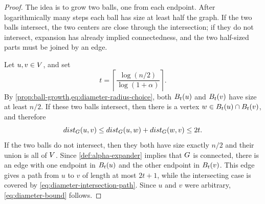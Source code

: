 \begin{proof}
	The idea is to grow two balls, one from each endpoint. After logarithmically many steps each ball has size at least half the graph. If the two balls intersect, the two centers are close through the intersection; if they do not intersect, expansion has already implied connectedness, and the two half-sized parts must be joined by an edge.

	Let \(u,v\in V\), and set
	\begin{equation}
		\label{eq:diameter-radius-choice}
		t=\left\lceil\frac{\log(n/2)}{\log(1+\alpha)}\right\rceil.
	\end{equation}
	By \cref{prop:ball-growth,eq:diameter-radius-choice}, both \(B_t(u)\) and \(B_t(v)\) have size at least \(n/2\). If these two balls intersect, then there is a vertex \(w\in B_t(u)\cap B_t(v)\), and therefore
	\begin{equation}
		\label{eq:diameter-intersection-path}
		dist_{G}(u,v)\leq dist_{G}(u,w)+dist_{G}(w,v)\leq 2t.
	\end{equation}
	If the two balls do not intersect, then they both have size exactly \(n/2\) and their union is all of \(V\). Since \cref{def:alpha-expander} implies that \(G\) is connected, there is an edge with one endpoint in \(B_t(u)\) and the other endpoint in \(B_t(v)\). This edge gives a path from \(u\) to \(v\) of length at most \(2t+1\), while the intersecting case is covered by \cref{eq:diameter-intersection-path}. Since \(u\) and \(v\) were arbitrary, \cref{eq:diameter-bound} follows.
\end{proof}

